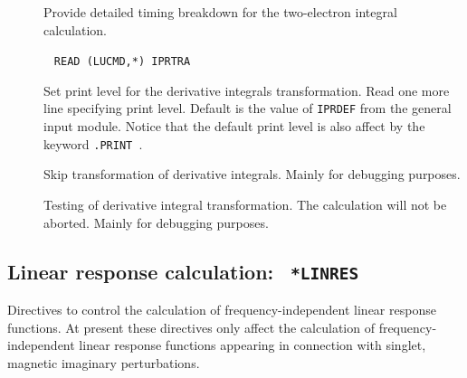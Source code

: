 \begin{description}
\item[] Provide detailed timing breakdown for the
two-electron integral calculation.

\item[]\verb| |\newline
\verb|READ (LUCMD,*) IPRTRA|

Set print level for the derivative integrals transformation.  Read one more
line specifying print level. Default is the value of
\verb|IPRDEF| from the general input module. Notice that the default print
level is also affect by the keyword \verb|.PRINT |.

\item[] Skip transformation of derivative integrals.
Mainly for debugging purposes.

\item[] Testing of derivative integral
transformation. The calculation will not be aborted. Mainly for
debugging purposes.
\end{description}

\subsection{Linear response calculation: {\tt
*LINRES}}\label{sec:linres}

Directives to control the calculation of frequency-independent linear
response functions. At
present these directives only affect the 
calculation of frequency-independent linear response functions appearing
in connection with singlet, magnetic imaginary perturbations. 


